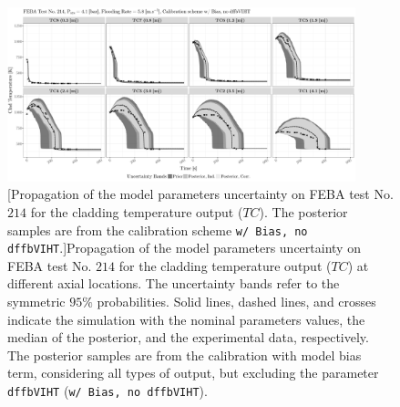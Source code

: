 \clearpage
\begin{figure}
	\centering
	\includegraphics[width=0.90\textwidth]{../figures/chapter5/figures/plotTraceUQPosteriorAllDiscCenteredNoParam8TC214}
		[Propagation of the model parameters uncertainty on FEBA test No. $214$ for the cladding temperature output ($TC$). The posterior samples are from the calibration scheme \texttt{w/ Bias, no dffbVIHT}.]{Propagation of the model parameters uncertainty on FEBA test No. $214$ for the cladding temperature output ($TC$) at different axial locations. The uncertainty bands refer to the symmetric $95\%$ probabilities. Solid lines, dashed lines, and crosses indicate the simulation with the nominal parameters values, the median of the posterior, and the experimental data, respectively. The posterior samples are from the calibration with model bias term, considering all types of output, but excluding the parameter \texttt{dffbVIHT} (\texttt{w/ Bias, no dffbVIHT}).}
	\label{fig:ch5_plot_trace_uq_post_tc_214_noparam8}
\end{figure}
\clearpage


